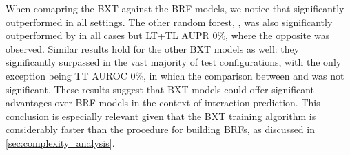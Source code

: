 
When comapring the BXT against the BRF models, we notice that  significantly outperformed  in all settings. The other random forest, , was also significantly outperformed by  in all cases but LT+TL AUPR 0\%, where the opposite was observed. Similar results hold for the other BXT models as well: they significantly surpassed  in the vast majority of test configurations, with the only exception being TT AUROC 0\%, in which the comparison between  and  was not significant. These results suggest that BXT models could offer significant advantages over BRF models in the context of interaction prediction. This conclusion is especially relevant given that the BXT training algorithm is considerably faster than the procedure for building BRFs, as discussed in \autoref{sec:complexity_analysis}.



